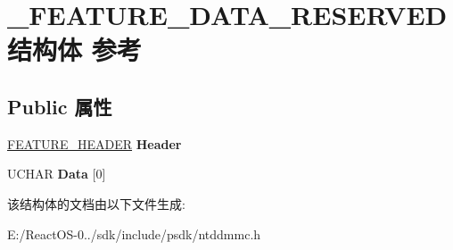 \hypertarget{struct___f_e_a_t_u_r_e___d_a_t_a___r_e_s_e_r_v_e_d}{}\section{\+\_\+\+F\+E\+A\+T\+U\+R\+E\+\_\+\+D\+A\+T\+A\+\_\+\+R\+E\+S\+E\+R\+V\+E\+D结构体 参考}
\label{struct___f_e_a_t_u_r_e___d_a_t_a___r_e_s_e_r_v_e_d}
\subsection*{Public 属性}
\begin{DoxyCompactItemize}
\item 
\mbox{\label{struct___f_e_a_t_u_r_e___d_a_t_a___r_e_s_e_r_v_e_d_ac599eda313c22fede734ae6561ca68f0}} 
\hyperlink{struct___f_e_a_t_u_r_e___h_e_a_d_e_r}{F\+E\+A\+T\+U\+R\+E\+\_\+\+H\+E\+A\+D\+ER} {\bfseries Header}
\item 
\mbox{\label{struct___f_e_a_t_u_r_e___d_a_t_a___r_e_s_e_r_v_e_d_a82f4b01a8fa7cccff8fea50a9495a640}} 
U\+C\+H\+AR {\bfseries Data} \mbox{[}0\mbox{]}
\end{DoxyCompactItemize}


该结构体的文档由以下文件生成\+:\begin{DoxyCompactItemize}
\item 
E\+:/\+React\+O\+S-\/0../sdk/include/psdk/ntddmmc.\+h\end{DoxyCompactItemize}
